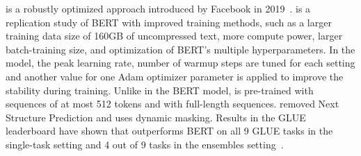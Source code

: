 \Roberta is a robustly optimized \Bert approach introduced by Facebook in 2019~\cite{LiuOGDJCLLZS2019}. 
\Roberta is a replication study of BERT with improved training methods, such as a larger training data size of 160GB of uncompressed text, more compute power, larger batch-training size, and optimization of BERT’s multiple hyperparameters. 
In the \Roberta model, the peak learning rate, number of warmup steps are tuned for each setting and another value for one Adam optimizer parameter is applied to improve the stability during training. 
Unlike in the BERT model, \Roberta is pre-trained with sequences of at most 512 tokens and with full-length sequences. 
\Roberta removed Next Structure Prediction and uses dynamic masking. 
Results in the GLUE leaderboard have shown that \Roberta outperforms BERT on all 9 GLUE tasks in the single-task setting and 4 out of 9 tasks in the ensembles setting~\cite{WangSMHLB2018,LiuOGDJCLLZS2019}.

